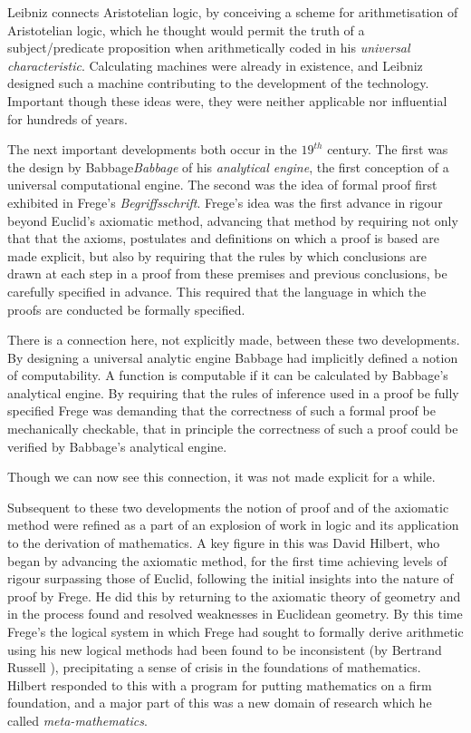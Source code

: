 Leibniz connects Aristotelian logic, by conceiving a scheme for
arithmetisation of Aristotelian logic, which he thought would permit
the truth of a subject/predicate proposition when arithmetically coded
in his \emph{universal characteristic}.
Calculating machines were already in existence, and Leibniz designed
such a machine contributing to the development of the technology.
Important though these ideas were, they were neither applicable nor
influential for hundreds of years.

The next important developments both occur in the $19^{th}$ century.
The first was the design by Babbage\emph{Babbage} of his
\emph{analytical engine}, the first
conception of a universal computational engine. 
The second was the idea of formal proof first exhibited in Frege's
\emph{Begriffsschrift}\cite{frege79}.
Frege's idea was the first advance in rigour beyond Euclid's axiomatic
method, advancing that method by requiring not only that that the
axioms, postulates and definitions on which a proof is based are made
explicit, but also by requiring that the rules by which conclusions
are drawn at each step in a proof from these premises and previous
conclusions, be carefully specified in advance.
This required that the language in which the proofs are conducted be
formally specified.

There is a connection here, not explicitly made, between these two
developments.
By designing a universal analytic engine Babbage had implicitly
defined a notion of computability.
A function is computable if it can be calculated by Babbage's
analytical engine.
By requiring that the rules of inference used in a proof be fully
specified Frege was demanding that the correctness of such a formal
proof be mechanically checkable, that in principle the correctness of
such a proof could be verified by Babbage's analytical engine.

Though we can now see this connection, it was not made explicit for a
while.

Subsequent to these two developments the notion of proof and of the
axiomatic method were refined as a part of an explosion of work in
logic and its application to the derivation of mathematics.
A key figure in this was David Hilbert, who began by advancing the
axiomatic method, for the first time achieving levels of rigour
surpassing those of Euclid, following the initial insights into the
nature of proof by Frege.
He did this by returning to the axiomatic theory of geometry and in
the process found and resolved weaknesses in Euclidean geometry.
By this time Frege's the logical system in which Frege had sought to
formally derive arithmetic using his new logical methods had been
found to be inconsistent (by Bertrand Russell ),
 precipitating a sense of crisis in the foundations of mathematics.
Hilbert responded to this with a program for putting mathematics on
a firm foundation, and a major part of this was a new domain of
research which he called
\emph{meta-mathematics}.

